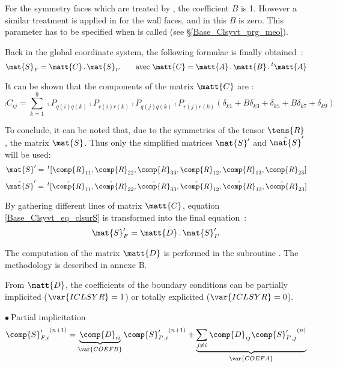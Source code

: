For the symmetry faces which are treated by , the
coefficient $B$ is 1. However a similar treatment is applied in
 for the wall faces, and in this $B$ is zero. This
parameter has to be specified when  is called
(see \S\ref{Base_Clsyvt_prg_meo}).

Back in the global coordinate system, the following formulae is
finally obtained~:
\begin{equation}
\label{Base_Clsyvt_eq_clsurS}
\mat{S}_F=\matt{C}\,.\,\mat{S}_{I'}\qquad
\text{avec }\matt{C}=\matt{A}\,.\,\matt{B}\,.\,^t\matt{A}
\end{equation}

It can be shown that the components of the matrix $\matt{C}$ are :
\begin{equation}
\comp{C}_{ij}=\sum_{k=1}^9
\comp{P}_{q(i)q(k)}\comp{P}_{r(i)r(k)}\comp{P}_{q(j)q(k)}\comp{P}_{r(j)r(k)}
(\delta_{k1}+B\delta_{k3}+\delta_{k5}+B\delta_{k7}+\delta_{k9})
\end{equation}

To conclude, it can be noted that, due to the symmetries of the tensor  $\tens{R}$,
 the matrix $\mat{S}$.
Thus only the simplified matrices
$\mat{S}^\prime$ and $\hat{\mat{S}}^\prime$ will be used:
\begin{equation}
\mat{S}^\prime=\,^t[\comp{R}_{11},\comp{R}_{22},\comp{R}_{33},
\comp{R}_{12},\comp{R}_{13},\comp{R}_{23}]
\end{equation}
\begin{equation}
\hat{\mat{S}}^\prime=\,^t[\hat{\comp{R}}_{11},\hat{\comp{R}}_{22},\hat{\comp{R}}_{33},
\hat{\comp{R}}_{12},\hat{\comp{R}}_{13},\hat{\comp{R}}_{23}]
\end{equation}

By gathering different lines of matrix $\matt{C}$, equation
\ref{Base_Clsyvt_eq_clsurS} is transformed into the final equation~:
\begin{equation}
\mat{S}_F^\prime=\matt{D}\,.\,\mat{S}_{I'}^\prime
\end{equation}

The computation of the matrix $\matt{D}$ is performed in the subroutine
. The methodology is described in annexe B.

From $\matt{D}$, the coefficients of the boundary conditions can be
 partially implicited ($\var{ICLSYR}=1$) or totally explicited
($\var{ICLSYR}=0$).

$\bullet\ ${\sc Partial implicitation}\\
\begin{equation}
\label{Base_Clsyvt_eq_clRimp}
{\comp{S}_{F,i}^\prime}^{(n+1)} =
\underbrace{\comp{D}_{ii}}_{\var{COEFB}}{\comp{S}_{I',i}^\prime}^{(n+1)}
+\underbrace{\sum_{j\ne i}\comp{D}_{ij}{\comp{S}_{I',j}^\prime}^{(n)}}_{\var{COEFA}}
\end{equation}

